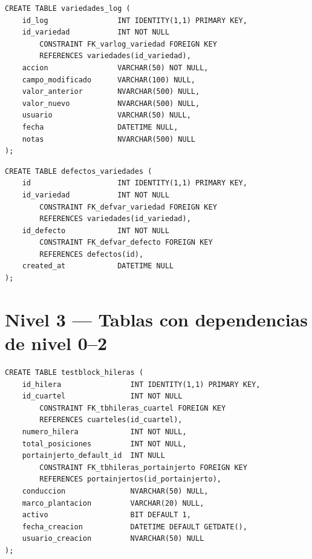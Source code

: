 \documentclass[12pt,a4paper,twoside]{report}
\begin{document}
\begin{lstlisting}[style=sqlstyle, caption={variedades\_log}]
CREATE TABLE variedades_log (
    id_log                INT IDENTITY(1,1) PRIMARY KEY,
    id_variedad           INT NOT NULL
        CONSTRAINT FK_varlog_variedad FOREIGN KEY
        REFERENCES variedades(id_variedad),
    accion                VARCHAR(50) NOT NULL,
    campo_modificado      VARCHAR(100) NULL,
    valor_anterior        NVARCHAR(500) NULL,
    valor_nuevo           NVARCHAR(500) NULL,
    usuario               VARCHAR(50) NULL,
    fecha                 DATETIME NULL,
    notas                 NVARCHAR(500) NULL
);
\end{lstlisting}

\begin{lstlisting}[style=sqlstyle, caption={defectos\_variedades}]
CREATE TABLE defectos_variedades (
    id                    INT IDENTITY(1,1) PRIMARY KEY,
    id_variedad           INT NOT NULL
        CONSTRAINT FK_defvar_variedad FOREIGN KEY
        REFERENCES variedades(id_variedad),
    id_defecto            INT NOT NULL
        CONSTRAINT FK_defvar_defecto FOREIGN KEY
        REFERENCES defectos(id),
    created_at            DATETIME NULL
);
\end{lstlisting}

\section{Nivel 3 --- Tablas con dependencias de nivel 0--2}

\begin{lstlisting}[style=sqlstyle, caption={testblock\_hileras}]
CREATE TABLE testblock_hileras (
    id_hilera                INT IDENTITY(1,1) PRIMARY KEY,
    id_cuartel               INT NOT NULL
        CONSTRAINT FK_tbhileras_cuartel FOREIGN KEY
        REFERENCES cuarteles(id_cuartel),
    numero_hilera            INT NOT NULL,
    total_posiciones         INT NOT NULL,
    portainjerto_default_id  INT NULL
        CONSTRAINT FK_tbhileras_portainjerto FOREIGN KEY
        REFERENCES portainjertos(id_portainjerto),
    conduccion               NVARCHAR(50) NULL,
    marco_plantacion         VARCHAR(20) NULL,
    activo                   BIT DEFAULT 1,
    fecha_creacion           DATETIME DEFAULT GETDATE(),
    usuario_creacion         NVARCHAR(50) NULL
);
\end{lstlisting}
\end{document}
